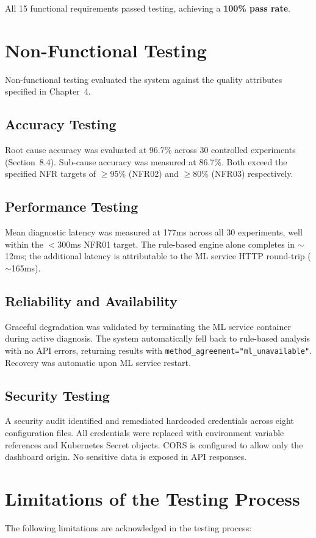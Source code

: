All 15 functional requirements passed testing, achieving a \textbf{100\% pass rate}.

\section{Non-Functional Testing}
Non-functional testing evaluated the system against the quality attributes specified in Chapter~4.

\subsection{Accuracy Testing}
Root cause accuracy was evaluated at 96.7\% across 30 controlled experiments (Section~8.4). Sub-cause accuracy was measured at 86.7\%. Both exceed the specified NFR targets of $\geq$95\% (NFR02) and $\geq$80\% (NFR03) respectively.

\subsection{Performance Testing}
Mean diagnostic latency was measured at 177ms across all 30 experiments, well within the $<$300ms NFR01 target. The rule-based engine alone completes in $\sim$12ms; the additional latency is attributable to the ML service HTTP round-trip ($\sim$165ms).

\subsection{Reliability and Availability}
Graceful degradation was validated by terminating the ML service container during active diagnosis. The system automatically fell back to rule-based analysis with no API errors, returning results with \texttt{method\_agreement="ml\_unavailable"}. Recovery was automatic upon ML service restart.

\subsection{Security Testing}
A security audit identified and remediated hardcoded credentials across eight configuration files. All credentials were replaced with environment variable references and Kubernetes Secret objects. CORS is configured to allow only the dashboard origin. No sensitive data is exposed in API responses.

\section{Limitations of the Testing Process}
The following limitations are acknowledged in the testing process:

